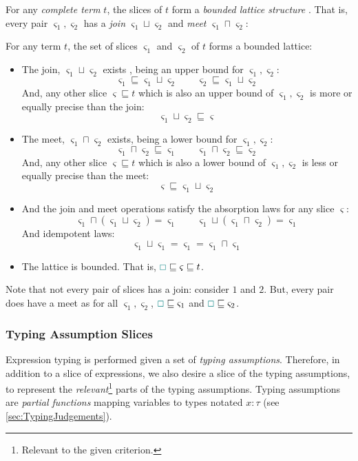 For any \textit{complete term} $t$, the slices of $t$ form a \textit{bounded lattice structure} \cite{Lattice}. That is, every pair $\varsigma_1, \varsigma_2$ has a \textit{join} $\varsigma_1 \sqcup \varsigma_2$ and \textit{meet} $\varsigma_1 \sqcap \varsigma_2$:
\begin{proposition}
For any term $t$, the set of slices $\varsigma_1$ and $\varsigma_2$ of $t$ forms a bounded lattice:

\begin{minipage}{0.95\textwidth}
\begin{itemize}
\item The join, $\varsigma_1 \sqcup \varsigma_2$ exists , being an upper bound for $\varsigma_1, \varsigma_2$:
\[\varsigma_1 \sqsubseteq \varsigma_1 \sqcup \varsigma_2\qquad \varsigma_2 \sqsubseteq \varsigma_1 \sqcup \varsigma_2\]
And, any other slice $\varsigma \sqsubseteq t$ which is also an upper bound of $\varsigma_1, \varsigma_2$ is more or equally precise than the join:
\[\varsigma_1 \sqcup \varsigma_2 \sqsubseteq \varsigma\]
\item The meet, $\varsigma_1 \sqcap \varsigma_2$ exists, being a lower bound for $\varsigma_1, \varsigma_2$:
\[\varsigma_1 \sqcap \varsigma_2 \sqsubseteq \varsigma_1\qquad  \varsigma_1 \sqcap \varsigma_2 \sqsubseteq\varsigma_2\]
And, any other slice $\varsigma \sqsubseteq t$ which is also a lower bound of $\varsigma_1, \varsigma_2$ is less or equally precise than the meet:
\[ \varsigma \sqsubseteq\varsigma_1 \sqcup \varsigma_2\]
\item And the join and meet operations satisfy the absorption laws for any slice $\varsigma$:
\[\varsigma_1 \sqcap (\varsigma_1 \sqcup \varsigma_2) = \varsigma_1 \qquad \varsigma_1 \sqcup (\varsigma_1 \sqcap \varsigma_2) = \varsigma_1\]
And idempotent laws:
\[\varsigma_1 \sqcup \varsigma_1 = \varsigma_1 = \varsigma_1 \sqcap \varsigma_1\]
\item The lattice is bounded. That is, ${\color{teal}\Box} \sqsubseteq \varsigma \sqsubseteq t$.
\end{itemize}
\end{minipage}
\end{proposition}

Note that not every pair of slices has a join: consider $1$ and $2$. But, every pair does have a meet as for all $\varsigma_1, \varsigma_2$, ${\color{teal}\Box} \sqsubseteq \varsigma_1$ and ${\color{teal}\Box} \sqsubseteq \varsigma_2$.
 
\subsubsection{Typing Assumption Slices}
Expression typing is performed given a set of \textit{typing assumptions}. Therefore, in addition to a slice of expressions, we also desire a slice of the typing assumptions, to represent the \textit{relevant}\footnote{Relevant to the given criterion.} parts of the typing assumptions. Typing assumptions are \textit{partial functions} mapping variables to types notated $x : \tau$ (see \cref{sec:TypingJudgements}). 


